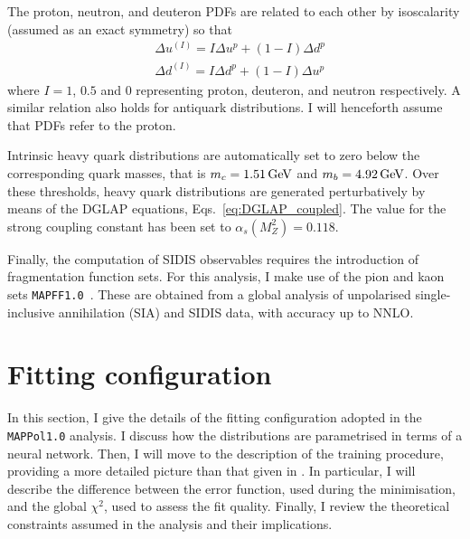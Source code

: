 The proton, neutron, and deuteron PDFs are related to each other by isoscalarity (assumed as an exact symmetry) so that
\begin{equation}
  \begin{split}
    &\Delta u^{(I)} = I \Delta u^p + ( 1 - I ) \Delta d^p \\
    &\Delta d^{(I)} = I \Delta d^p + ( 1 - I ) \Delta u^p
  \end{split}
  \label{eq:iso_rel}
\end{equation}
where $I=1$, $0.5$ and $0$ representing proton, deuteron, and neutron respectively. A similar relation also holds for antiquark distributions. I will henceforth assume that PDFs refer to the proton.%

Intrinsic heavy quark distributions are automatically set to zero below the corresponding quark masses, that is $m_c=1.51\, \textrm{GeV}$ and $m_b=4.92\, \textrm{GeV}$. Over these thresholds, heavy quark distributions are generated perturbatively by means of the DGLAP equations, Eqs.~\eqref{eq:DGLAP_coupled}. The value for the strong coupling constant has been set to $\alpha_s(M_Z^2) = 0.118$.%

Finally, the computation of SIDIS observables requires the introduction of fragmentation function sets. For this analysis, I make use of the pion and kaon sets \texttt{MAPFF1.0}~\cite{Khalek:2021gxf, AbdulKhalek:2022laj}. These are obtained from a global analysis of unpolarised single-inclusive annihilation (SIA) and SIDIS data, with accuracy up to NNLO.

\section{Fitting configuration}
\label{sec:4.3}
In this section, I give the details of the fitting configuration adopted in the \texttt{MAPPol1.0} analysis. I discuss how the distributions are parametrised in terms of a neural network. Then, I will move to the description of the training procedure, providing a more detailed picture than that given in . In particular, I will describe the difference between the error function, used during the minimisation, and the global $\chi^2$, used to assess the fit quality. Finally, I review the theoretical constraints assumed in the analysis and their implications.

